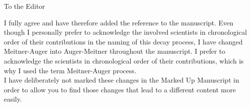 \documentclass[DIN,pagenumber=false,parskip=half,fromalign=left,fromphone=false,fromemail=true,fromurl=false,fromlogo=false,fromrule=false]{scrlttr2}
\begin{document}
\begin{letter}{To the Editor}
\begin{itemize}
       I fully agree and have therefore added the reference to the manuscript.
       Even though I personally prefer to acknowledge the involved scientists in
       chronological order of their contributions
       in the naming of this decay process, I have changed Meitner-Auger into
       Auger-Meitner throughout the manuscript.
       I prefer to acknowledge the scientists in chronological order of their
       contributions, which is why
       I used the term Meitner-Auger process.\\
       I have deliberately not marked these changes in
       the Marked Up Manuscript in order to allow you to find those changes that
       lead to a different content more easily.
\end{itemize}


\end{letter}
\end{document}
